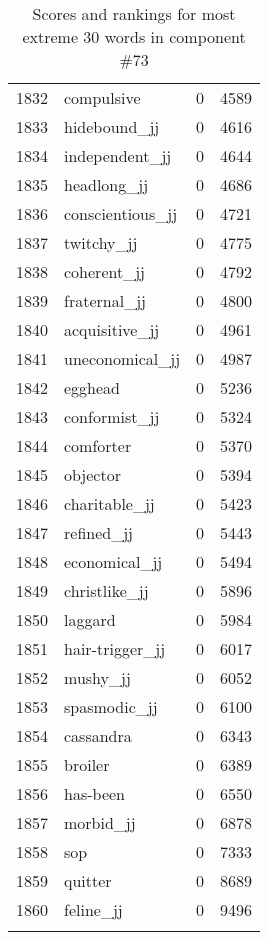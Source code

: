 \begin{longtable}[!htbp]{| rlr@{.}l |}
    1832 & compulsive & 0 & 4589 \\
    1833 & hidebound\_jj & 0 & 4616 \\
    1834 & independent\_jj & 0 & 4644 \\
    1835 & headlong\_jj & 0 & 4686 \\
    1836 & conscientious\_jj & 0 & 4721 \\
    1837 & twitchy\_jj & 0 & 4775 \\
    1838 & coherent\_jj & 0 & 4792 \\
    1839 & fraternal\_jj & 0 & 4800 \\
    1840 & acquisitive\_jj & 0 & 4961 \\
    1841 & uneconomical\_jj & 0 & 4987 \\
    1842 & egghead & 0 & 5236 \\
    1843 & conformist\_jj & 0 & 5324 \\
    1844 & comforter & 0 & 5370 \\
    1845 & objector & 0 & 5394 \\
    1846 & charitable\_jj & 0 & 5423 \\
    1847 & refined\_jj & 0 & 5443 \\
    1848 & economical\_jj & 0 & 5494 \\
    1849 & christlike\_jj & 0 & 5896 \\
    1850 & laggard & 0 & 5984 \\
    1851 & hair-trigger\_jj & 0 & 6017 \\
    1852 & mushy\_jj & 0 & 6052 \\
    1853 & spasmodic\_jj & 0 & 6100 \\
    1854 & cassandra & 0 & 6343 \\
    1855 & broiler & 0 & 6389 \\
    1856 & has-been & 0 & 6550 \\
    1857 & morbid\_jj & 0 & 6878 \\
    1858 & sop & 0 & 7333 \\
    1859 & quitter & 0 & 8689 \\
    1860 & feline\_jj & 0 & 9496 \\
    \hline
    \caption{Scores and rankings for most extreme 30 words in component \#73} \\
\end{longtable}

